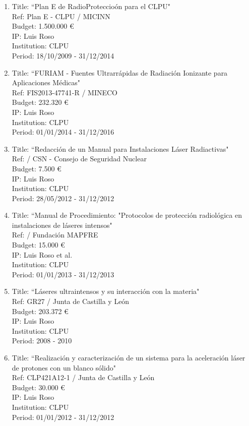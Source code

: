 \begin{enumerate}
\item Title: ``Plan E de RadioProteccio\'on para el CLPU"\\
Ref:  Plan E - CLPU  / MICINN \\
Budget:  1.500.000 \euro \\
IP:  Luis Roso \\
Institution: CLPU \\
Period: 18/10/2009 - 31/12/2014 \\

\item Title: ``FURIAM - Fuentes Ultrarr\'apidas de Radiaci\'on Ionizante para Aplicaciones M\'edicas"\\
Ref:  FIS2013-47741-R      / MINECO \\
Budget:  232.320 \euro \\
IP:  Luis Roso \\
Institution:  CLPU \\
Period: 01/01/2014 - 31/12/2016 \\

\item Title: ``Redacci\'on de un Manual para Instalaciones L\'aser Radiactivas"\\
Ref:        / CSN - Consejo de Seguridad Nuclear \\
Budget:  7.500 \euro \\
IP:  Luis Roso \\
Institution: CLPU \\
Period:  28/05/2012 - 31/12/2012 \\

\item Title: ``Manual de Procedimiento: "Protocolos de protecci\'on radiol\'ogica en instalaciones de l\'aseres intensos"\\
Ref:       / Fundaci\'on MAPFRE \\
Budget: 15.000 \euro \\
IP:  Luis Roso et al. \\
Institution: CLPU \\
Period: 01/01/2013 - 31/12/2013 \\

\item Title: ``L\'aseres ultraintensos y su interacci\'on con la materia"\\
Ref:    GR27   / Junta de Castilla y Le\'on \\
Budget: 203.372 \euro \\
IP:  Luis Roso \\
Institution:  CLPU \\
Period: 2008 - 2010

\item Title: ``Realizaci\'on y caracterizaci\'on de un sistema para la aceleraci\'on l\'aser de protones con un blanco s\'olido"\\
Ref:  CLP421A12-1     / Junta de Castilla y Le\'on \\
Budget: 30.000 \euro \\
IP:  Luis Roso \\
Institution:  CLPU \\
Period: 01/01/2012 - 31/12/2012

\end{enumerate}